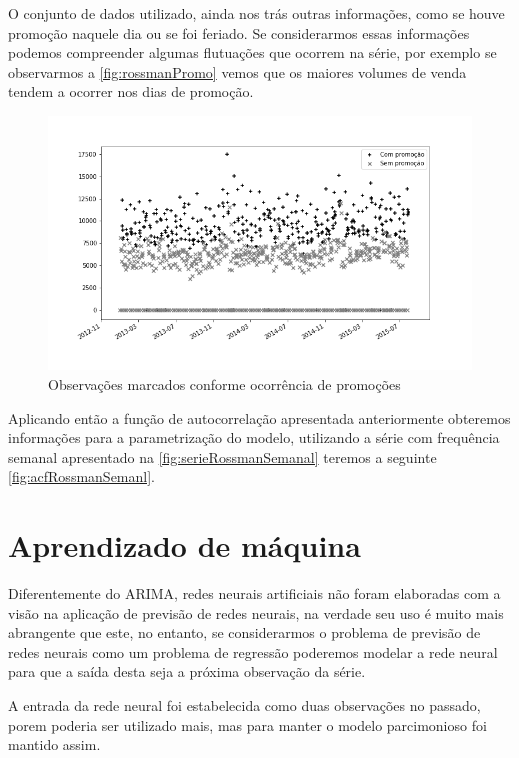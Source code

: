 \documentclass[
	12pt,
	oneside,
	a4paper,
	english,
	brazil
]{abntex2}
\begin{document}
O conjunto de dados utilizado, ainda nos trás outras informações, como se houve 
promoção naquele dia ou se foi feriado. Se considerarmos essas informações 
podemos compreender algumas flutuações que ocorrem na série, por exemplo se 
observarmos a \autoref{fig:rossmanPromo} vemos que os maiores volumes de venda 
tendem a ocorrer nos dias de promoção.

\begin{figure}
    \centering
    \caption{Observações marcados conforme ocorrência de promoções}
    \includegraphics[width=.7\textwidth]{images/graficoRossmanPromo.png}
\end{figure}

Aplicando então a função de autocorrelação apresentada anteriormente obteremos 
informações para a parametrização do modelo, utilizando a série com frequência 
semanal apresentado na \autoref{fig:serieRossmanSemanal} teremos a seguinte 
\autoref{fig:acfRossmanSemanl}.


\section{Aprendizado de máquina}

Diferentemente do ARIMA, redes neurais artificiais não foram elaboradas com a 
visão na aplicação de previsão de redes neurais, na verdade seu uso é muito mais 
abrangente que este, no entanto, se considerarmos o problema de previsão de 
redes neurais como um problema de regressão poderemos modelar a rede neural para 
que a saída desta seja a próxima observação da série.

A entrada da rede neural foi estabelecida como duas observações no passado, 
porem poderia ser utilizado mais, mas para manter o modelo parcimonioso foi 
mantido assim.
\end{document}
